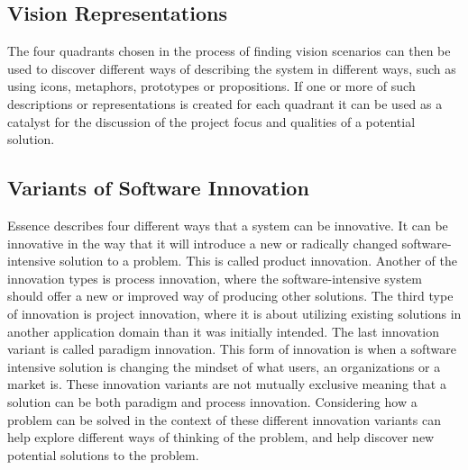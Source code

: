 \subsection{Vision Representations}
\label{sub:vision_representations}

The four quadrants chosen in the process of finding vision scenarios can then be used to discover different ways of describing the system in different ways, such as using icons, metaphors, prototypes or propositions. If one or more of such descriptions or representations is created for each quadrant it can be used as a catalyst for the discussion of the project focus and qualities of a potential solution. 

\subsection{Variants of Software Innovation}
\label{sub:essence_innovation_variants}

Essence describes four different ways that a system can be innovative. It can be innovative in the way that it will introduce a new or radically changed software-intensive solution to a problem. This is called product innovation. Another of the innovation types is process innovation, where the software-intensive system should offer a new or improved way of producing other solutions. The third type of innovation is project innovation, where it is about utilizing existing solutions in another application domain than it was initially intended. The last innovation variant is called paradigm innovation. This form of innovation is when a software intensive solution is changing the mindset of what users, an organizations or a market is. These innovation variants are not mutually exclusive meaning that a solution can be both paradigm and process innovation. Considering how a problem can be solved in the context of these different innovation variants can help explore different ways of thinking of the problem, and help discover new potential solutions to the problem.

